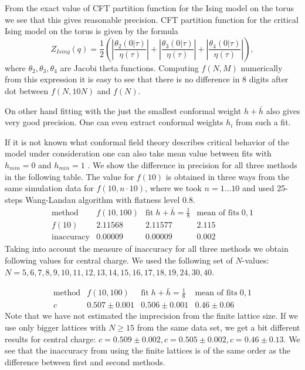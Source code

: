 \documentclass[aps,prl,reprint]{revtex4-1}
\begin{document}
From  the exact value of CFT partition
function for the Ising model on the torus we see that this gives reasonable precision.
CFT partition function for the critical Ising model on the torus is given by the formula
\begin{equation}
  \label{eq:15}
  Z_{Ising}(q)=\frac{1}{2}\left(\left|\frac{\theta_{2}(0|\tau)}{\eta(\tau)}\right|+\left|\frac{\theta_{3}(0|\tau)}{\eta(\tau)}\right|+\left|\frac{\theta_{4}(0|\tau)}{\eta(\tau)}\right|\right),
\end{equation}
where $\theta_{2},\theta_{3},\theta_{4}$ are Jacobi theta functions. Computing $f(N,M)$ numerically from this
expression it is easy to see that there is no difference in 8 digits after dot between $f(N,10 N)$
and $f(N)$. 

On other hand fitting with the just the smallest conformal weight $h+\bar h$ also gives very good
precision. One can even extract conformal weights $h_{i}$ from such a fit. 

If it is not known what conformal field theory describes critical behavior of the model
under consideration one can also take mean value between fits with $h_{min}=0$ and $h_{min}=1$ . We
show the difference in precision for all three methods in the following table. The value for $f(10)$
is obtained in three ways from the same simulation data for $f(10,n\cdot 10)$, where we took
$n=1\dots 10$ and used 25-steps Wang-Landau algorithm with flatness level $0.8$. 
\begin{equation}
  \label{eq:16}
  \begin{array}{c||c|c|c}
    \mbox{method} & f(10,100) & \mbox{fit}\; h+\bar h=\frac{1}{8} & \mbox{mean of fits} \;0,1\\
    \hline
    f(10) & 2.11568 & 2.11577 & 2.115 \\
    \mbox{inaccuracy} & 0.00009 & 0.00009 & 0.002
  \end{array}
\end{equation}
Taking into account the measure of inaccuracy for all three methods we obtain following values for
central charge. We used the following set of $N$-values:
$N=5,6,7,8,9,10,11,12,13,14,15,16,17,18,19,24,30,40$. 

\begin{equation}
  \label{eq:17}
  \begin{array}{c||c|c|c}
    \mbox{method} & f(10,100) & \mbox{fit}\; h+\bar h=\frac{1}{8} & \mbox{mean of fits} \;0,1\\
    \hline
    c &  0.507\pm 0.001 & 0.506\pm 0.001 & 0.46\pm 0.06 
  \end{array}
\end{equation}
Note that we have not estimated the imprecision from the finite lattice size. If we use only bigger
lattices with $N\geq 15$  from the same data set,  we get a bit different results for central
charge: $c=0.509\pm 0.002, c=0.505\pm 0.002, c=0.46\pm 0.13$. We see that the inaccuracy from using
the finite lattices is of the same order as the difference between first and second methods. 
\end{document}
